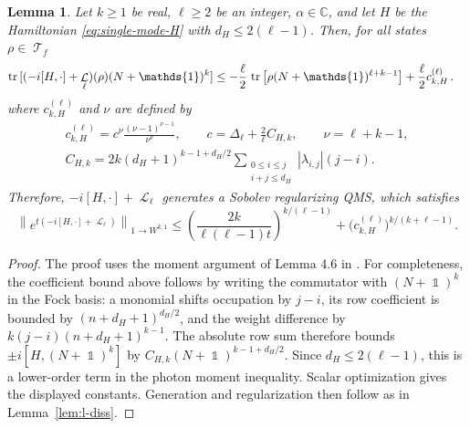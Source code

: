 \documentclass[11pt]{article}
\theoremstyle{myplain}
\newtheorem{lem}[lem]{Lemma}
\theoremstyle{mydefinition}
\theoremstyle{remark}
\DeclareMathOperator{\cL}{\mathcal{L}}
\DeclareMathOperator{\cT}{\mathcal{T}}
\DeclareMathOperator{\1}{\mathds{1}}
\newcommand{\tr}[1][]{\operatorname{tr}%
  \ifx#1\empty \else \left[ #1 \right] \fi}
\begin{document}
        \begin{lem}\label{lem:l-diss-hamiltonian}
            Let $k \geq 1$ be real, $\ell \geq 2$ be an integer, $\alpha \in \mathbb{C}$, and let $H$ be the Hamiltonian \eqref{eq:single-mode-H} with $d_H\leq 2(\ell-1)$. Then, for all states $\rho\in\cT_f$
            \begin{equation}
                \begin{aligned}
                    \tr[(-i[H,\cdot] + \cL_\ell)(\rho)(N+\1)^{k}] &\leq-\frac{\ell}{2}\,\tr[\rho(N+\1)^{\ell+k-1}]+\frac{\ell}{2}c_{k,H}^{(\ell)}\,.\label{eqdiffLH}
                \end{aligned}
            \end{equation}
            where $c_{k,H}^{(\ell)}$ and $\nu$ are defined by
            \begin{equation*}
                \begin{gathered}
                    c_{k,H}^{(\ell)}=c^\nu\frac{(\nu-1)^{\nu-1}}{\nu^\nu},\qquad
                    c=\Delta_\ell+\frac{2}{\ell}C_{H,k},\qquad \nu=\ell+k-1,\\
                    C_{H,k}=2k(d_H+1)^{k-1+d_H/2}
                    \sum_{\substack{0\leq i\leq j\\i+j\leq d_H}}|\lambda_{i,j}|(j-i).
                \end{gathered}
            \end{equation*}
            Therefore, $-i[H,\cdot] + \cL_\ell$ generates a Sobolev regularizing QMS, which satisfies
            \begin{equation*}
                \left\|e^{t(-i[H,\cdot]+\cL_\ell)}\right\|_{1\to W^{k,1}}
                \leq\left(\frac{2k}{\ell(\ell-1)t}\right)^{k/(\ell-1)}
                +\bigl(c_{k,H}^{(\ell)}\bigr)^{k/(k+\ell-1)}.
            \end{equation*}

        \end{lem}
        \begin{proof}
            The proof uses the moment argument of Lemma 4.6 in \cite{Gondolf.2024}. For completeness, the coefficient bound above follows by writing the commutator with $(N+\1)^k$ in the Fock basis: a monomial shifts occupation by $j-i$, its row coefficient is bounded by $(n+d_H+1)^{d_H/2}$, and the weight difference by $k(j-i)(n+d_H+1)^{k-1}$. The absolute row sum therefore bounds $\pm i[H,(N+\1)^k]$ by $C_{H,k}(N+\1)^{k-1+d_H/2}$. Since $d_H\leq2(\ell-1)$, this is a lower-order term in the photon moment inequality. Scalar optimization gives the displayed constants. Generation and regularization then follow as in Lemma~\ref{lem:l-diss}.
        \end{proof}
\end{document}
